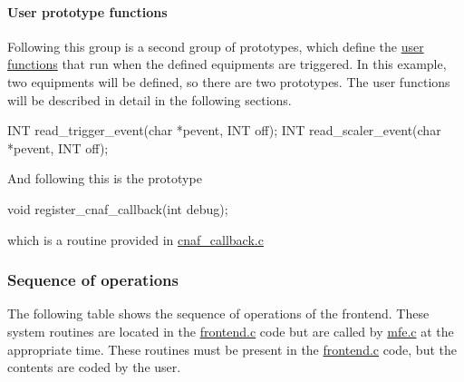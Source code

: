 \par
 \hypertarget{FE_code_sections_FE_user_prototypes}{}\paragraph{User prototype functions}\label{FE_code_sections_FE_user_prototypes}
Following this group is a second group of prototypes, which define the \hyperlink{FrontendOperation_FE_equipment_readout_function}{user functions} that run when the defined equipments are triggered. In this example, two equipments will be defined, so there are two prototypes. The user functions will be described in detail in the following sections. 
\begin{DoxyCode}
INT read_trigger_event(char *pevent, INT off);
INT read_scaler_event(char *pevent, INT off);
\end{DoxyCode}


And following this is the prototype 
\begin{DoxyCode}
void register_cnaf_callback(int debug);
\end{DoxyCode}
 which is a routine provided in \hyperlink{cnaf__callback_8c}{cnaf\_\-callback.c}

\par
  \par


\label{index_end}
\hypertarget{index_end}{}
 \subsubsection{Sequence of operations}\label{FE_sequence}
\par
  \par


\label{FE_sequence_idx_Frontend_sequence-of-operations}
\hypertarget{FE_sequence_idx_Frontend_sequence-of-operations}{}
 The following table shows the sequence of operations of the frontend. These system routines are located in the \hyperlink{frontend_8c}{frontend.c} code but are called by \hyperlink{mfe_8c}{mfe.c} at the appropriate time. These routines must be present in the \hyperlink{frontend_8c}{frontend.c} code, but the contents are coded by the user.

